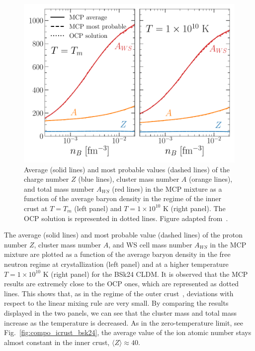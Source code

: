 \begin{figure}[!t]
  \begin{center}
    \includegraphics[width=0.9\linewidth]{figures/compo_icrust_bsk24_mcp.pdf}
  \end{center}
  \caption[Equilibrium composition of the multicomponent plasma versus
  baryon density in the inner-crust regime]{
    Average (solid lines) and most probable values (dashed lines) of the charge 
    number $Z$ (blue lines), cluster mass number $A$ (orange lines), and total
    mass number $A_{WS}$ (red lines) in the MCP mixture as a function of 
    the average baryon density in the regime of the inner crust at 
    $T=T_m$ (left panel) and $T=1\times 10^{10}$ \si{\kelvin} (right panel). 
    The OCP solution is represented in dotted lines.
    Figure adapted from~\cite{Carreau2020}.}\label{fig:compo_icrust_bsk24_mcp}
\end{figure}
%
The average (solid lines) and most probable value (dashed lines) of the proton 
number $Z$, cluster mass number $A$, and WS cell mass number $A_{WS}$ in the 
MCP mixture are plotted as a function of the average baryon density in the free 
neutron regime at crystallization (left panel) and at a higher temperature 
$T=1\times 10^{10}$ K (right panel) for the BSk24 CLDM.
%
It is observed that the MCP results are extremely close to the OCP ones, which 
are represented as dotted lines. This shows that, as in the regime of the outer 
crust~\cite{Fantina2020}, deviations with respect to the linear mixing rule are 
very small.
%
By comparing the results displayed in the two panels, we can see that the 
cluster mass and total mass increase as the temperature is decreased. 
%
As in the zero-temperature limit, see Fig.~\ref{fig:compo_icrust_bsk24}, the 
average value of the ion atomic number stays almost constant in the inner 
crust, $\langle Z\rangle \approx 40$.

